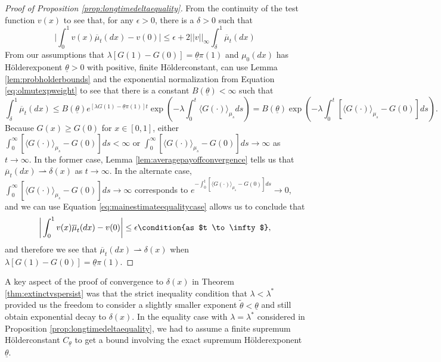 \documentclass[11pt]{article}
\numberwithin{equation}{section}
\newcommand{\ol}{\overline}
\newcommand{\holder}{H{\"o}lder\:}
\newcommand{\supholderupperbound}[1]{B(#1)}
\begin{document}
{\begin{proof} [Proof of Proposition \ref{prop:longtimedeltaequality}]
From the continuity of the test function $v(x)$ to see that, for any $\epsilon > 0$, there is a $\delta > 0$  such that %
\begin{dmath} \label{eq:mainestimateequalitycase} \bigg| \int_0^1 v(x) \ol{\mu}_t(dx) - v(0)   \bigg|   \leq \epsilon +  2 ||v||_{\infty}   \int_{\delta}^1 \ol{\mu}_t(dx) %
\end{dmath}
From our assumptions that $\lambda \left[G(1) - G(0)\right] = \underline{\theta} \pi(1)$ and $\mu_0(dx)$ has \holder exponent $\underline{\theta} > 0$ with positive, finite \holder constant, can use Lemma \ref{lem:probholderbounds} and the exponential normalization from Equation \eqref{eq:olmutexpweight} to see that there is a constant $\supholderupperbound{\underline{\theta}}< \infty$ such that  
\begin{dmath} \label{eq:probexpestimate} \int_{\delta}^1 \ol{\mu}_t(dx) \leq \supholderupperbound{\underline{\theta}}  e^{\left[\lambda G(1) - \underline{\theta} \pi(1)\right] t} \exp\left(- \lambda \int_0^t \langle G(\cdot) \rangle_{\mu_s} ds \right) = \supholderupperbound{\underline{\theta}} \exp\left(- \lambda \int_0^t \left[ \langle G(\cdot) \rangle_{\mu_s} - G(0) \right] ds \right). \end{dmath}
Because $G(x) \geq G(0)$ for $x \in [0,1]$, either $\int_0^{\infty} \left[ \langle G(\cdot) \rangle_{\mu_s} - G(0) \right]ds < \infty$ or $ \int_0^{\infty} \left[ \langle G(\cdot) \rangle_{\mu_s} - G(0) \right]ds  \to \infty$ as $t \to \infty$. In the former case, Lemma \ref{lem:averagepayoffconvergence} tells us that $\ol{\mu}_t(dx) \rightharpoonup \delta(x)$ as $t \to \infty$. In the alternate case,  $ \int_0^{\infty}  \left[ \langle G(\cdot) \rangle_{\mu_s} - G(0) \right]ds  \to \infty$ corresponds to $e^{- \int_0^{t} \left[ \langle G(\cdot) \rangle_{\mu_s} - G(0) \right]ds} \to 0$, and we can use Equation \eqref{eq:mainestimateequalitycase} allows us to conclude that
\begin{dmath*} \bigg| \int_0^1 v(x) \ol{\mu}_t(dx) - v(0)   \bigg|   \leq \epsilon \condition{as $t \to \infty$}, \end{dmath*}
and therefore we see that $\ol{\mu}_t(dx) \rightharpoonup \delta(x)$ when $\lambda \left[G(1) - G(0) \right] = \underline{\theta} \pi(1)$. 
\end{proof}

\begin{remark}
A key aspect of the proof of convergence to $\delta(x)$ in Theorem \ref{thm:extinctvspersist} was that the strict inequality condition that $\lambda < \lambda^*$ provided us the freedom to consider a slightly smaller exponent $\tilde{\theta} < \underline{\theta}$ and still obtain exponential decay to $\delta(x)$. In the equality case with $\lambda = \lambda^*$ considered in Proposition \ref{prop:longtimedeltaequality}, we had to assume a finite supremum \holder constant $C_{\underline{\theta}}$ to get a bound involving the exact supremum \holder exponent $\underline{\theta}$.
\end{remark}

}
\end{document}
